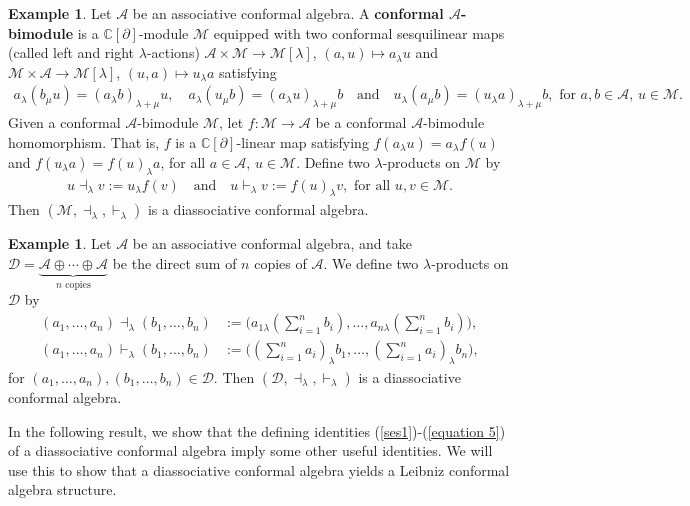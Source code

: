 \documentclass[a4paper,reqno,10pt]{amsart}
\theoremstyle{plain}
\theoremstyle{definition}
\newtheorem{exam}[thm]{Example}
\theoremstyle{remark}
\newcommand{\C}{\mathbb{C}}
\newcommand{\M}{\mathcal{M}}
\newcommand{\la}{\lambda}
\begin{document}
\begin{exam}
Let $\mathcal{A}$ be an associative conformal algebra. A {\bf conformal $\mathcal{A}$-bimodule} is a $\C [\partial]$-module $\M$ equipped with two conformal sesquilinear maps (called left and right $\la$-actions) $ \mathcal{A} \times \M \rightarrow \M [\la]$, $(a, u) \mapsto a_\la u$ and $\M \times \mathcal{A} \rightarrow \M [\la]$, $(u, a) \mapsto u_\la a$ satisfying
\begin{align*}
a_{\la}(b_{\mu}u)=(a_{\la}b)_{\la+\mu}u, \quad
a_{\la}(u_{\mu}b)=(a_{\la}u)_{\la+\mu}b ~~~ \text{ and } ~~~
u_{\la}(a_{\mu}b)=(u_{\la}a)_{\la+\mu}b, \text{ for }a,b\in\mathcal{A},\, u \in\mathcal{M}.
\end{align*}
Given a conformal $\mathcal{A}$-bimodule $\M$, let $f:\M\to\mathcal{A}$ be a conformal $\mathcal{A}$-bimodule homomorphism. That is, $f$ is a $\C[\partial]$-linear map satisfying $f(a_{\la}u)=a_{\la}f(u)$ and $f(u_{\la}a)=f(u)_{\la}a$, for all $a \in \mathcal{A}$, $u \in \M$. Define two $\la$-products on $\M$ by
\begin{align*}
u\dashv_{\la}v:=u_{\la}f(v) ~~~ \text{ and } ~~~ 
u\vdash_{\la}v:=f(u)_{\la}v, \text{ for all } u,v\in\M.
\end{align*}
Then $(\M,\dashv_{\la},\vdash_{\la})$ is a diassociative conformal algebra.
\end{exam}
\begin{exam}
Let $\mathcal{A}$ be an associative conformal algebra, and take $\mathcal{D}=\underbrace{\mathcal{A}\oplus\cdots\oplus\mathcal{A}}_{n\text{ copies}}$ be the direct sum of $n$ copies of $\mathcal{A}$. We define two $\la$-products on $\mathcal{D}$ by
\begin{align*}
(a_1,\ldots,a_n)\dashv_{\la}(b_1,\ldots,b_n)
&:=
\big(
a_{1\la} (\sum_{i=1}^{n}b_i ),
\ldots,
a_{n\la} (\sum_{i=1}^{n}b_i )
\big),\\
(a_1,\ldots,a_n)\vdash_{\la}(b_1,\ldots,b_n)
&:=
\big(
(\sum_{i=1}^{n}a_i)_{\la}b_1,
\ldots,
(\sum_{i=1}^{n}a_i )_{\la}b_n
\big),
\end{align*}
for $(a_1,\ldots,a_n),(b_1,\ldots,b_n)\in\mathcal{D}$. Then $(\mathcal{D},\dashv_{\la},\vdash_{\la})$ is a diassociative conformal algebra.
\end{exam}

In the following result, we show that the defining identities (\ref{ses1})-(\ref{equation 5}) of a diassociative conformal algebra imply some other useful identities. We will use this to show that a diassociative conformal algebra yields a Leibniz conformal algebra structure.
\end{document}

